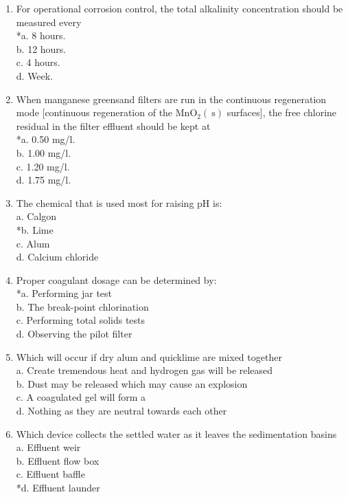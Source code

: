 \begin{enumerate}
  \item For operational corrosion control, the total alkalinity concentration should be measured every\\
*a. 8 hours.\\
b. 12 hours.\\
c. 4 hours.\\
d. Week.\\

\item When manganese greensand filters are run in the continuous regeneration mode [continuous regeneration of the $\mathrm{MnO}_{2}(\mathrm{~s})$ surfaces], the free chlorine residual in the filter effluent should be kept at\\
*a. 0.50 mg/l.\\
b. 1.00 mg/l.\\
c. 1.20 mg/l.\\
d. 1.75 mg/l.\\

\item The chemical that is used most for raising pH is:\\
a. Calgon\\
*b. Lime\\
c. Alum\\
d. Calcium chloride\\

\item Proper coagulant dosage can be determined by:\\
*a. Performing jar test\\
b. The break-point chlorination\\
c. Performing total solids tests\\
d. Observing the pilot filter\\

\item Which will occur if dry alum and quicklime are mixed together\\
a.	Create tremendous heat and hydrogen gas will be released\\
b.	Dust may be released which may cause an explosion\\
c.	A coagulated gel will form	a\\
d.	Nothing as they are neutral towards each other\\

\item Which device collects the settled water as it leaves the sedimentation basins\\
a.	Effluent weir\\
b.	Effluent flow box\\
c. Effluent baffle\\
*d.  Effluent launder\\


\end{enumerate}
